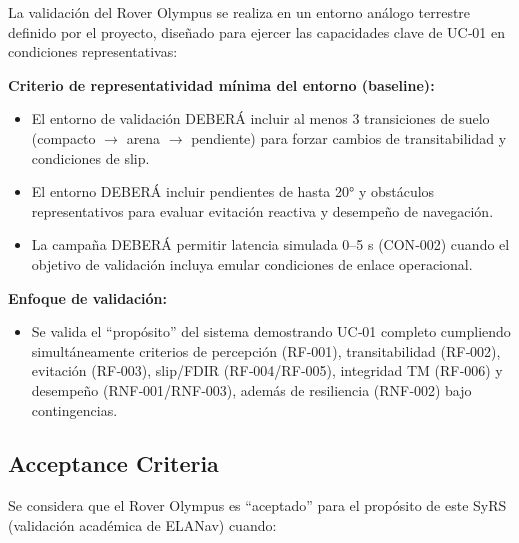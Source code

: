 La validación del Rover Olympus se realiza en un entorno análogo terrestre definido por el proyecto, diseñado para ejercer las capacidades clave de UC‑01 en condiciones representativas:

\textbf{Criterio de representatividad mínima del entorno (baseline):}
\begin{itemize}
    \item El entorno de validación DEBERÁ incluir al menos 3 transiciones de suelo (compacto $\rightarrow$ arena $\rightarrow$ pendiente) para forzar cambios de transitabilidad y condiciones de slip. \cite{omg_sysml_mbse, segoldmine_ppi}  
    \item El entorno DEBERÁ incluir pendientes de hasta 20° y obstáculos representativos para evaluar evitación reactiva y desempeño de navegación. \cite{nasa_cm, segoldmine_ppi, omg_sysml_mbse}  
    \item La campaña DEBERÁ permitir latencia simulada 0–5 s (CON‑002) cuando el objetivo de validación incluya emular condiciones de enlace operacional. \cite{nasa_cm, segoldmine_ppi, omg_sysml_mbse}  
\end{itemize}

\textbf{Enfoque de validación:}
\begin{itemize}
    \item Se valida el ``propósito'' del sistema demostrando UC‑01 completo cumpliendo simultáneamente criterios de percepción (RF‑001), transitabilidad (RF‑002), evitación (RF‑003), slip/FDIR (RF‑004/RF‑005), integridad TM (RF‑006) y desempeño (RNF‑001/RNF‑003), además de resiliencia (RNF‑002) bajo contingencias. \cite{nasa_cm, segoldmine_ppi, omg_sysml_mbse}
\end{itemize}

\subsection{Acceptance Criteria}

Se considera que el Rover Olympus es ``aceptado'' para el propósito de este SyRS (validación académica de ELANav) cuando:


